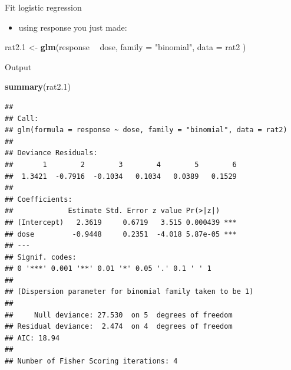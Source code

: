\documentclass[ignorenonframetext,]{beamer}
\newenvironment{Shaded}{\begin{snugshade}}{\end{snugshade}}
\newcommand{\DataTypeTok}[1]{\textcolor[rgb]{0.13,0.29,0.53}{#1}}
\newcommand{\FloatTok}[1]{\textcolor[rgb]{0.00,0.00,0.81}{#1}}
\newcommand{\KeywordTok}[1]{\textcolor[rgb]{0.13,0.29,0.53}{\textbf{#1}}}
\newcommand{\NormalTok}[1]{#1}
\newcommand{\OperatorTok}[1]{\textcolor[rgb]{0.81,0.36,0.00}{\textbf{#1}}}
\newcommand{\StringTok}[1]{\textcolor[rgb]{0.31,0.60,0.02}{#1}}
\providecommand{\tightlist}{%
  \setlength{\itemsep}{0pt}\setlength{\parskip}{0pt}}
\begin{document}
\begin{frame}[fragile]{Fit logistic regression}
\protect\hypertarget{fit-logistic-regression}{}

\begin{itemize}
\tightlist
\item
  using response you just made:
\end{itemize}

\begin{Shaded}
\begin{Highlighting}[]
\NormalTok{rat2}\FloatTok{.1}\NormalTok{ <-}\StringTok{ }\KeywordTok{glm}\NormalTok{(response }\OperatorTok{~}\StringTok{ }\NormalTok{dose,}
  \DataTypeTok{family =} \StringTok{"binomial"}\NormalTok{,}
  \DataTypeTok{data =}\NormalTok{ rat2}
\NormalTok{)}
\end{Highlighting}
\end{Shaded}

\end{frame}

\begin{frame}[fragile]{Output}
\protect\hypertarget{output-2}{}

\scriptsize

\begin{Shaded}
\begin{Highlighting}[]
\KeywordTok{summary}\NormalTok{(rat2}\FloatTok{.1}\NormalTok{)}
\end{Highlighting}
\end{Shaded}

\begin{verbatim}
## 
## Call:
## glm(formula = response ~ dose, family = "binomial", data = rat2)
## 
## Deviance Residuals: 
##       1        2        3        4        5        6  
##  1.3421  -0.7916  -0.1034   0.1034   0.0389   0.1529  
## 
## Coefficients:
##             Estimate Std. Error z value Pr(>|z|)    
## (Intercept)   2.3619     0.6719   3.515 0.000439 ***
## dose         -0.9448     0.2351  -4.018 5.87e-05 ***
## ---
## Signif. codes:  
## 0 '***' 0.001 '**' 0.01 '*' 0.05 '.' 0.1 ' ' 1
## 
## (Dispersion parameter for binomial family taken to be 1)
## 
##     Null deviance: 27.530  on 5  degrees of freedom
## Residual deviance:  2.474  on 4  degrees of freedom
## AIC: 18.94
## 
## Number of Fisher Scoring iterations: 4
\end{verbatim}

\normalsize

\end{frame}
\end{document}
